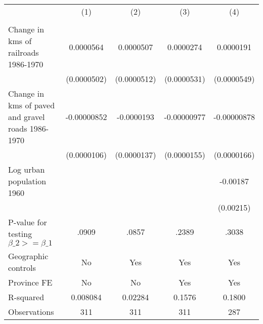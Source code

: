 {
\def\sym#1{\ifmmode^{#1}\else\(^{#1}\)\fi}
\begin{tabular}{l*{4}{c}}
\hline\hline
                &\multicolumn{1}{c}{(1)}&\multicolumn{1}{c}{(2)}&\multicolumn{1}{c}{(3)}&\multicolumn{1}{c}{(4)}\\
                &\multicolumn{1}{c}{}&\multicolumn{1}{c}{}&\multicolumn{1}{c}{}&\multicolumn{1}{c}{}\\
\hline
Change in kms of railroads 1986-1970&0.0000564         &0.0000507         &0.0000274         &0.0000191         \\
                &(0.0000502)         &(0.0000512)         &(0.0000531)         &(0.0000549)         \\
[1em]
Change in kms of paved and gravel roads 1986-1970&-0.00000852         &-0.0000193         &-0.00000977         &-0.00000878         \\
                &(0.0000106)         &(0.0000137)         &(0.0000155)         &(0.0000166)         \\
[1em]
Log urban population 1960&                  &                  &                  & -0.00187         \\
                &                  &                  &                  &(0.00215)         \\
\hline
P-value for testing $\beta\_{2} >= \beta\_{1}$&    .0909         &    .0857         &    .2389         &    .3038         \\
Geographic controls&       No         &      Yes         &      Yes         &      Yes         \\
Province FE     &       No         &       No         &      Yes         &      Yes         \\
R-squared       & 0.008084         &  0.02284         &   0.1576         &   0.1800         \\
Observations    &      311         &      311         &      311         &      287         \\
\hline\hline
\end{tabular}
}
